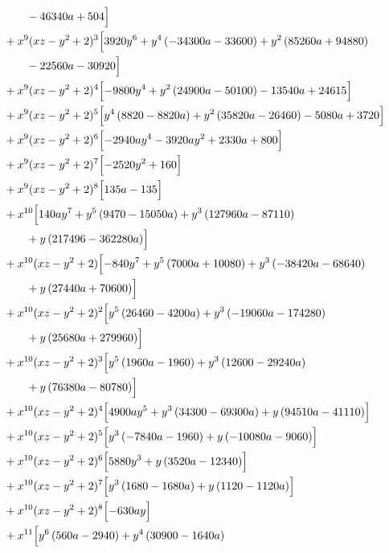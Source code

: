 \begin{align*}
&\qquad - 46340 a + 504\Bigr]\\
&{}+x^{9}(xz-y^2+2)^{3}\Bigl[3920 y^{6} + y^{4} \left(- 34300 a - 33600\right) + y^{2} \left(85260 a + 94880\right)\\
&\qquad - 22560 a - 30920\Bigr]\\
&{}+x^{9}(xz-y^2+2)^{4}\Bigl[- 9800 y^{4} + y^{2} \left(24900 a - 50100\right) - 13540 a + 24615\Bigr]\\
&{}+x^{9}(xz-y^2+2)^{5}\Bigl[y^{4} \left(8820 - 8820 a\right) + y^{2} \left(35820 a - 26460\right) - 5080 a + 3720\Bigr]\\
&{}+x^{9}(xz-y^2+2)^{6}\Bigl[- 2940 a y^{4} - 3920 a y^{2} + 2330 a + 800\Bigr]\\
&{}+x^{9}(xz-y^2+2)^{7}\Bigl[- 2520 y^{2} + 160\Bigr]\\
&{}+x^{9}(xz-y^2+2)^{8}\Bigl[135 a - 135\Bigr]\\
&{}+x^{10}\Bigl[140 a y^{7} + y^{5} \left(9470 - 15050 a\right) + y^{3} \left(127960 a - 87110\right)\\
&\qquad + y \left(217496 - 362280 a\right)\Bigr]\\
&{}+x^{10}(xz-y^2+2)\Bigl[- 840 y^{7} + y^{5} \left(7000 a + 10080\right) + y^{3} \left(- 38420 a - 68640\right)\\
&\qquad + y \left(27440 a + 70600\right)\Bigr]\\
&{}+x^{10}(xz-y^2+2)^{2}\Bigl[y^{5} \left(26460 - 4200 a\right) + y^{3} \left(- 19060 a - 174280\right)\\
&\qquad + y \left(25680 a + 279960\right)\Bigr]\\
&{}+x^{10}(xz-y^2+2)^{3}\Bigl[y^{5} \left(1960 a - 1960\right) + y^{3} \left(12600 - 29240 a\right)\\
&\qquad + y \left(76380 a - 80780\right)\Bigr]\\
&{}+x^{10}(xz-y^2+2)^{4}\Bigl[4900 a y^{5} + y^{3} \left(34300 - 69300 a\right) + y \left(94510 a - 41110\right)\Bigr]\\
&{}+x^{10}(xz-y^2+2)^{5}\Bigl[y^{3} \left(- 7840 a - 1960\right) + y \left(- 10080 a - 9060\right)\Bigr]\\
&{}+x^{10}(xz-y^2+2)^{6}\Bigl[5880 y^{3} + y \left(3520 a - 12340\right)\Bigr]\\
&{}+x^{10}(xz-y^2+2)^{7}\Bigl[y^{3} \left(1680 - 1680 a\right) + y \left(1120 - 1120 a\right)\Bigr]\\
&{}+x^{10}(xz-y^2+2)^{8}\Bigl[- 630 a y\Bigr]\\
&{}+x^{11}\Bigl[y^{6} \left(560 a - 2940\right) + y^{4} \left(30900 - 1640 a\right)\\

\end{align*}
